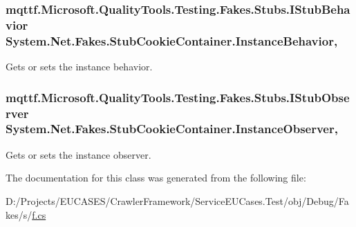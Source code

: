 \hypertarget{class_system_1_1_net_1_1_fakes_1_1_stub_cookie_container_aaa7f0548bdda6f329e96b388d3e35435}{
\subsubsection[{Instance\-Behavior}]{\setlength{\rightskip}{0pt plus 5cm}mqttf.\-Microsoft.\-Quality\-Tools.\-Testing.\-Fakes.\-Stubs.\-I\-Stub\-Behavior System.\-Net.\-Fakes.\-Stub\-Cookie\-Container.\-Instance\-Behavior\hspace{0.3cm}{\ttfamily [get]}, {\ttfamily [set]}}}\label{class_system_1_1_net_1_1_fakes_1_1_stub_cookie_container_aaa7f0548bdda6f329e96b388d3e35435}


Gets or sets the instance behavior.

\hypertarget{class_system_1_1_net_1_1_fakes_1_1_stub_cookie_container_a61228a3007cd9e1b1acfc2da9bfd0fa1}{
\subsubsection[{Instance\-Observer}]{\setlength{\rightskip}{0pt plus 5cm}mqttf.\-Microsoft.\-Quality\-Tools.\-Testing.\-Fakes.\-Stubs.\-I\-Stub\-Observer System.\-Net.\-Fakes.\-Stub\-Cookie\-Container.\-Instance\-Observer\hspace{0.3cm}{\ttfamily [get]}, {\ttfamily [set]}}}\label{class_system_1_1_net_1_1_fakes_1_1_stub_cookie_container_a61228a3007cd9e1b1acfc2da9bfd0fa1}


Gets or sets the instance observer.



The documentation for this class was generated from the following file\-:\begin{DoxyCompactItemize}
\item 
D\-:/\-Projects/\-E\-U\-C\-A\-S\-E\-S/\-Crawler\-Framework/\-Service\-E\-U\-Cases.\-Test/obj/\-Debug/\-Fakes/s/\hyperlink{s_2f_8cs}{f.\-cs}\end{DoxyCompactItemize}
